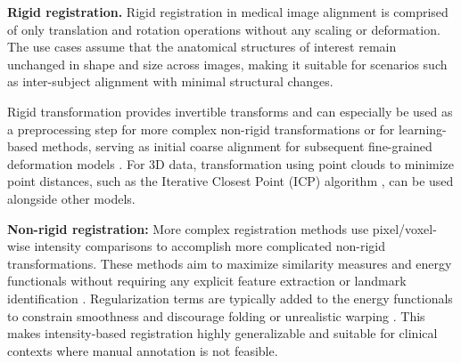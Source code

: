\documentclass[lettersize,journal]{IEEEtran}
\begin{document}
\textbf{Rigid registration.}
Rigid registration in medical image alignment is comprised of only translation and rotation operations without any scaling or deformation. The use cases assume that the anatomical structures of interest remain unchanged in shape and size across images, making it suitable for scenarios such as inter-subject alignment with minimal structural changes.

Rigid transformation provides invertible transforms and can especially be used as a preprocessing step for more complex non-rigid transformations or for learning-based methods, serving as initial coarse alignment for subsequent fine-grained deformation models \cite{Frackowiak2004-yy}. For 3D data, transformation using point clouds to minimize point distances, such as the Iterative Closest Point (ICP) algorithm %
\cite{Zhang1994IterativePM}, can be used alongside other models.

\textbf{Non-rigid registration:}
More complex registration methods use pixel/voxel-wise intensity comparisons to accomplish more complicated non-rigid transformations. These methods aim to maximize similarity measures and energy functionals without requiring any explicit feature extraction or landmark identification \cite{regreviewsong}. Regularization terms are typically added to the energy functionals  to constrain smoothness and discourage folding or unrealistic warping \cite{Reithmeir2024}. This makes intensity-based registration highly generalizable and suitable for clinical contexts where manual annotation is not feasible.
\end{document}
